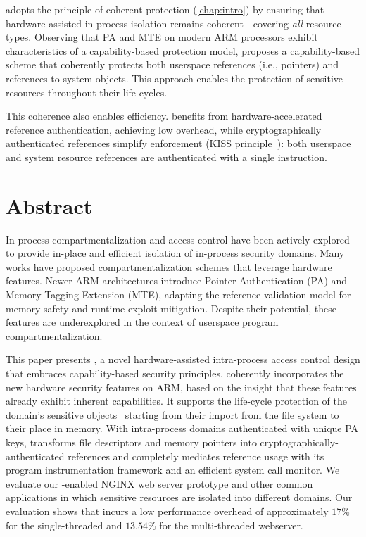 
\capacity adopts the principle of coherent protection (\cref{chap:intro}) by ensuring that hardware-assisted in-process isolation remains coherent—covering \emph{all} resource types.
Observing that PA and MTE on modern ARM processors exhibit characteristics of a capability-based protection model, \capacity proposes a capability-based scheme that coherently protects both userspace references (i.e., pointers) and references to system objects.
This approach enables the protection of sensitive resources throughout their life cycles.

This coherence also enables efficiency.
\capacity benefits from hardware-accelerated reference authentication, achieving low overhead, while cryptographically authenticated references simplify enforcement (KISS principle~\cite{kiss}): both userspace and system resource references are authenticated with a single instruction.

\clearpage









\newcommand{\thename}{\capacity}



\section{Abstract}
In-process compartmentalization and access control have been actively explored to provide in-place and efficient isolation of in-process security domains. Many works have proposed compartmentalization schemes that leverage hardware features.
Newer ARM architectures introduce Pointer Authentication (PA) and Memory Tagging Extension (MTE), adapting the reference validation model for memory safety and runtime exploit mitigation.
Despite their potential, these features are underexplored in the context of userspace program compartmentalization.

This paper presents \thename, a novel hardware-assisted intra-process access control design that embraces capability-based security principles.
\thename coherently incorporates the new hardware security features on ARM, based on the insight that these features already exhibit inherent capabilities.
It supports the life-cycle protection of the domain's sensitive objects \dash\ starting from their import from the file system to their place in memory.
With intra-process domains authenticated with unique PA keys, \thename transforms file descriptors and memory pointers into cryptographically-authenticated references and completely mediates reference usage with its program instrumentation framework and an efficient system call monitor.
We evaluate our \thename-enabled NGINX web server prototype and other common applications in which sensitive resources are isolated into different domains. Our evaluation shows that \thename incurs a low performance overhead of approximately $17\%$ for the single-threaded and $13.54\%$ for the multi-threaded webserver.

